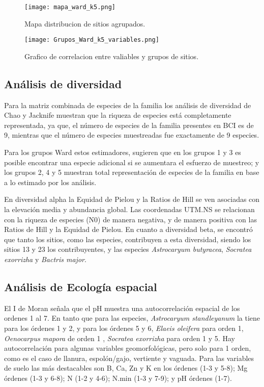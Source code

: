 \documentclass[11pt,]{article}
\begin{document}
\begin{figure}
\centering
\texttt{[image: mapa\_ward\_k5.png]}
\caption{Mapa distribucion de sitios agrupados.
\label{fig:mapa_ward_k5}}
\end{figure}

\begin{figure}
\centering
\texttt{[image: Grupos\_Ward\_k5\_variables.png]}
\caption{Grafico de correlacion entre valiables y grupos de sitios.
\label{fig:Grupos_Ward_k5_variables}}
\end{figure}

\subsection{Análisis de diversidad}\label{anuxe1lisis-de-diversidad}

Para la matriz combinada de especies de la familia los análisis de
diversidad de Chao y Jacknife muestran que la riqueza de especies está
completamente representada, ya que, el número de especies de la familia
presentes en BCI es de 9, mientras que el número de especies muestreadas
fue exactamente de 9 especies.

Para los grupos Ward estos estimadores, sugieren que en los grupos 1 y 3
es posible encontrar una especie adicional si se aumentara el esfuerzo
de muestreo; y los grupos 2, 4 y 5 muestran total representación de
especies de la familia en base a lo estimado por los análisis.

En diversidad alpha la Equidad de Pielou y la Ratios de Hill se ven
asociadas con la elevación media y abundancia global. Las coordenadas
UTM.NS se relacionan con la riqueza de especies (N0) de manera negativa,
y de manera positiva con las Ratios de Hill y la Equidad de Pielou. En
cuanto a diversidad beta, se encontró que tanto los sitios, como las
especies, contribuyen a esta diversidad, siendo los sitios 13 y 23 los
contribuyentes, y las especies \emph{Astrocaryum butyracea},
\emph{Socratea exorrizha} y \emph{Bactris major}.

\subsection{Análisis de Ecología
espacial}\label{anuxe1lisis-de-ecologuxeda-espacial}

El I de Moran señala que el pH muestra una autocorrelación espacial de
los ordenes 1 al 7. En tanto que para las especies, \emph{Astrocaryum
standleyanum} la tiene para los órdenes 1 y 2, y para los órdenes 5 y 6,
\emph{Elaeis oleifera} para orden 1, \emph{Oenocarpus mapora} de orden 1
, \emph{Socratea exorrizha} para orden 1 y 5. Hay autocorrelación para
algunas variables geomorfológicas, pero solo para 1 orden, como es el
caso de llanura, espolón/gajo, vertiente y vaguada. Para las variables
de suelo las más destacables son B, Ca, Zn y K en los órdenes (1-3 y
5-8); Mg órdenes (1-3 y 6-8); N (1-2 y 4-6); N.min (1-3 y 7-9); y pH
órdenes (1-7).
\end{document}
